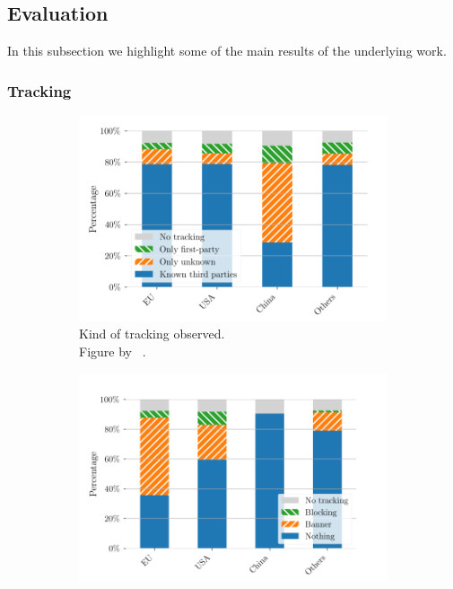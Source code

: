 \subsection{Evaluation}

In this subsection we highlight some of the main results of the underlying work.

\subsubsection{Tracking}

\begin{figure}
    \centering
    \begin{subfigure}[b]{.5\textwidth}
        \centering
        \includegraphics[width=\textwidth, scale=0.27]{figures/tracking_kind_trans.png}
        \caption{Kind of tracking observed.\\Figure by \citeauthor{sanchez2019can}~\cite[Fig.~1]{sanchez2019can}.}
        \label{fig:tracking_kind}
    \end{subfigure}
    \begin{subfigure}[b]{.5\textwidth}
        \centering
        \includegraphics[width=\textwidth, scale=0.3]{figures/cookie_notice_size_trans.png}

\end{subfigure}
\end{figure}
